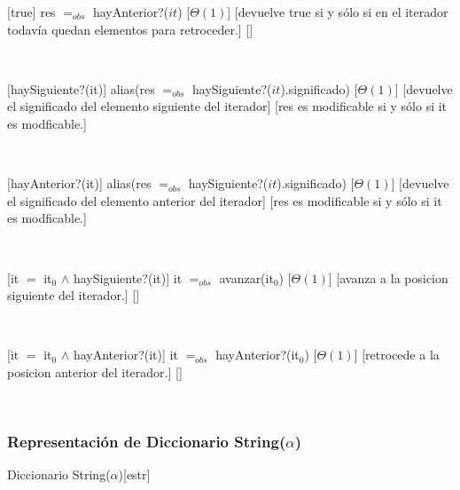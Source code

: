[true]
{res $=_{obs}$ hayAnterior?($it$)}
[$\Theta(1)$]
[devuelve true si y sólo si en el iterador todavía quedan elementos para retroceder.]
[]



~

[haySiguiente?(it)]
{alias(res $=_{obs}$ haySiguiente?($it$).significado)}
[$\Theta(1)$]
[devuelve el significado del elemento siguiente del iterador]
[res es modificable si y sólo si it es modficable.]

~


[hayAnterior?(it)]
{alias(res $=_{obs}$ haySiguiente?($it$).significado)}
[$\Theta(1)$]
[devuelve el significado del elemento anterior del iterador]
[res es modificable si y sólo si it es modficable.]

~

[it $=$ it$_0$ $\land$ haySiguiente?(it)]
{it $=_{obs}$ avanzar(it$_0$)}
[$\Theta(1)$]
[avanza a la posicion siguiente del iterador.]
[]

~

[it $=$ it$_0$ $\land$ hayAnterior?(it)]
{it $=_{obs}$ hayAnterior?(it$_0$)}
[$\Theta(1)$]
[retrocede a la posicion anterior del iterador.]
[]

~


\pagebreak

\subsubsection{Representación de Diccionario String($\alpha$)}

\begin{Estructura}{ Diccionario String($\alpha$)}[estr]
	\begin{Tupla}[estr]
	\end{Tupla}

	~

	\begin{Tupla}[Nodo]
	\end{Tupla}

\end{Estructura}

